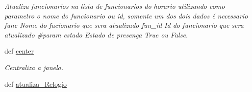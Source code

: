 \begin{DoxyCompactItemize}
\begin{DoxyCompactList}\small\item\em \-Atualiza funcionarios na lista de funcionarios do horario utilizando como parametro o nome do funcionario ou id, somente um dos dois dados é necessario  func \-Nome do fucionario que sera atualizado  fun\-\_\-id \-Id do funcionario que sera atualizado \#param estado \-Estado de presença \-True ou \-False. \end{DoxyCompactList}\item 
\hypertarget{classview_1_1Controle__De__Acesso__Window_a4ab756c92e8b2138b7dcf240197ddfc9}{def \hyperlink{classview_1_1Controle__De__Acesso__Window_a4ab756c92e8b2138b7dcf240197ddfc9}{center}}\label{classview_1_1Controle__De__Acesso__Window_a4ab756c92e8b2138b7dcf240197ddfc9}

\begin{DoxyCompactList}\small\item\em \-Centraliza a janela. \end{DoxyCompactList}\item 
\hypertarget{classview_1_1Controle__De__Acesso__Window_a2ed9d80f7bae2c87c2679710b9bbba24}{def \hyperlink{classview_1_1Controle__De__Acesso__Window_a2ed9d80f7bae2c87c2679710b9bbba24}{atualiza\-\_\-\-Relogio}}\label{classview_1_1Controle__De__Acesso__Window_a2ed9d80f7bae2c87c2679710b9bbba24}


\end{DoxyCompactItemize}
